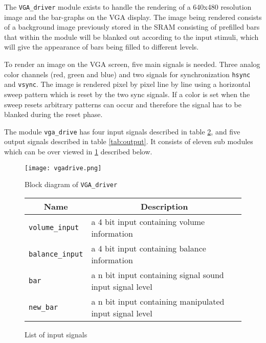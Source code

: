 The \verb+VGA_driver+ module exists to handle the rendering of a 640x480 resolution image and the bar-graphs on
the VGA display. The image being rendered consists of a background image previously 
stored in the SRAM consisting of prefilled bars that within the module will be blanked
out according to the input stimuli, which will give the appearance of bars being filled 
to different levels.   

To render an image on the VGA screen, five main signals is needed. Three analog color channels (red, green and blue)
and two signals for synchronization \verb=hsync= and \verb=vsync=. The image is rendered pixel by pixel line by line using
a horizontal sweep pattern which is reset by the two sync signals. If a color is set when the sweep resets
arbitrary patterns can occur and therefore the signal has to be blanked during the reset phase.

The module \verb+vga_drive+ has four input signals described in table \ref{tab:input}, and five output signals described
in table \ref{tab:output}. It consists of eleven sub modules which can be over viewed in \ref{fig:vgadrive} described below.


\begin{figure}[H]
        \centering
        \texttt{[image: vgadrive.png]}
        \caption{Block diagram of \texttt{VGA\_driver}}
        \label{fig:vgadrive}
\end{figure}


\begin{figure}[H]
        \centering
        \caption{List of input signals}
        \label{tab:input}
\begin{tabular}{|l|l|}
        \hline
        \multicolumn{1}{|c|}{Name} & \multicolumn{1}{|c|}{Description} \\
        
        \hline
        \verb+volume_input+ & a 4 bit input containing volume information\\
        \cline{1-2}
        \hline
        \verb+balance_input+ & a 4 bit input containing balance information\\
        \cline{1-2}    
        \hline
        \verb+bar+ & a n bit input containing signal sound input signal level\\
        \cline{1-2}    
        \hline
        \verb+new_bar+ & a n bit input containing manipulated input signal level\\
        \cline{1-2}    
        \hline
\end{tabular}
\end{figure}

